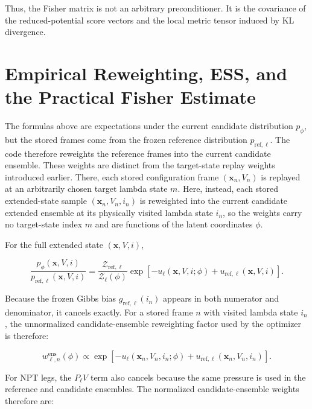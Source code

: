 Thus, the Fisher matrix is not an arbitrary preconditioner. It is the covariance of the reduced-potential score vectors and the local metric tensor induced by KL divergence.

\section{Empirical Reweighting, ESS, and the Practical Fisher Estimate}

The formulas above are expectations under the current candidate distribution $p_\phi$, but the stored frames come from the frozen reference distribution $p_{\mathrm{ref},\ell}$. The code therefore reweights the reference frames into the current candidate ensemble. These weights are distinct from the target-state replay weights introduced earlier. There, each stored configuration frame $(\mathbf{x}_n, V_n)$ is replayed at an arbitrarily chosen target lambda state $m$. Here, instead, each stored extended-state sample $(\mathbf{x}_n, V_n, i_n)$ is reweighted into the current candidate extended ensemble at its physically visited lambda state $i_n$, so the weights carry no target-state index $m$ and are functions of the latent coordinates $\phi$.

For the full extended state $(\mathbf{x}, V, i)$,

\begin{equation}
    \frac{
        p_\phi(\mathbf{x}, V, i)
    }{
        p_{\mathrm{ref},\ell}(\mathbf{x}, V, i)
    }
    =
    \frac{
        \mathcal{Z}_{\mathrm{ref},\ell}
    }{
        \mathcal{Z}_\ell(\phi)
    }
    \exp \left[
        -
        u_\ell(\mathbf{x}, V, i; \phi)
        +
        u_{\mathrm{ref},\ell}(\mathbf{x}, V, i)
    \right].
    \label{eq:ratio}
\end{equation}

Because the frozen Gibbs bias $g_{\mathrm{ref},\ell}(i_n)$ appears in both numerator and denominator, it cancels exactly. For a stored frame $n$ with visited lambda state $i_n$, the unnormalized candidate-ensemble reweighting factor used by the optimizer is therefore:

\begin{equation}
    w^{\mathrm{ens}}_{\ell,n}(\phi)
    \propto
    \exp \left[
        -
        u_\ell(\mathbf{x}_n, V_n, i_n; \phi)
        +
        u_{\mathrm{ref},\ell}(\mathbf{x}_n, V_n, i_n)
    \right].
    \label{eq:wactive}
\end{equation}

For NPT legs, the $P_\ell V$ term also cancels because the same pressure is used in the reference and candidate ensembles. The normalized candidate-ensemble weights therefore are:

